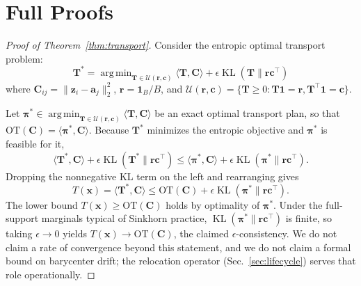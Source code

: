 \documentclass[11pt,a4paper]{article}
\theoremstyle{definition}
\DeclareMathOperator{\KL}{KL}
\DeclareMathOperator{\argmin}{arg\,min}
\begin{document}
\appendix
\section{Full Proofs}
\label{sec:proofs}

\begin{proof}[Proof of Theorem~\ref{thm:transport}]
Consider the entropic optimal transport problem:
\begin{equation}
\mathbf{T}^* = \argmin_{\mathbf{T} \in \mathcal{U}(\mathbf{r},\mathbf{c})} \langle \mathbf{T}, \mathbf{C} \rangle + \epsilon \KL(\mathbf{T} \| \mathbf{r}\mathbf{c}^\top)
\end{equation}
where $\mathbf{C}_{ij} = \|\mathbf{z}_i - \mathbf{a}_j\|_2^2$, $\mathbf{r} = \mathbf{1}_B/B$, and $\mathcal{U}(\mathbf{r},\mathbf{c}) = \{\mathbf{T} \geq 0: \mathbf{T}\mathbf{1} = \mathbf{r}, \mathbf{T}^\top\mathbf{1} = \mathbf{c}\}$.

Let $\boldsymbol{\pi}^* \in \argmin_{\mathbf{T} \in \mathcal{U}(\mathbf{r},\mathbf{c})} \langle \mathbf{T}, \mathbf{C} \rangle$ be an exact optimal transport plan, so that $\mathrm{OT}(\mathbf{C}) = \langle \boldsymbol{\pi}^*, \mathbf{C} \rangle$. Because $\mathbf{T}^*$ minimizes the entropic objective and $\boldsymbol{\pi}^*$ is feasible for it,
\begin{equation}
\langle \mathbf{T}^*, \mathbf{C} \rangle + \epsilon \KL(\mathbf{T}^* \| \mathbf{r}\mathbf{c}^\top) \leq \langle \boldsymbol{\pi}^*, \mathbf{C} \rangle + \epsilon \KL(\boldsymbol{\pi}^* \| \mathbf{r}\mathbf{c}^\top).
\end{equation}
Dropping the nonnegative KL term on the left and rearranging gives
\begin{equation}
T(\mathbf{x}) = \langle \mathbf{T}^*, \mathbf{C} \rangle \leq \mathrm{OT}(\mathbf{C}) + \epsilon \KL(\boldsymbol{\pi}^* \| \mathbf{r}\mathbf{c}^\top).
\end{equation}
The lower bound $T(\mathbf{x}) \geq \mathrm{OT}(\mathbf{C})$ holds by optimality of $\boldsymbol{\pi}^*$. Under the full-support marginals typical of Sinkhorn practice, $\KL(\boldsymbol{\pi}^* \| \mathbf{r}\mathbf{c}^\top)$ is finite, so taking $\epsilon \to 0$ yields $T(\mathbf{x}) \to \mathrm{OT}(\mathbf{C})$, the claimed $\epsilon$-consistency. We do not claim a rate of convergence beyond this statement, and we do not claim a formal bound on barycenter drift; the relocation operator (Sec.~\ref{sec:lifecycle}) serves that role operationally.
\end{proof}
\end{document}
